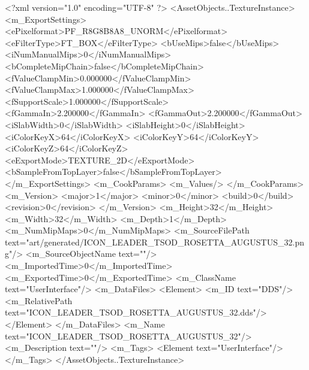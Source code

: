 <?xml version="1.0" encoding="UTF-8" ?>
<AssetObjects..TextureInstance>
	<m_ExportSettings>
		<ePixelformat>PF_R8G8B8A8_UNORM</ePixelformat>
		<eFilterType>FT_BOX</eFilterType>
		<bUseMips>false</bUseMips>
		<iNumManualMips>0</iNumManualMips>
		<bCompleteMipChain>false</bCompleteMipChain>
		<fValueClampMin>0.000000</fValueClampMin>
		<fValueClampMax>1.000000</fValueClampMax>
		<fSupportScale>1.000000</fSupportScale>
		<fGammaIn>2.200000</fGammaIn>
		<fGammaOut>2.200000</fGammaOut>
		<iSlabWidth>0</iSlabWidth>
		<iSlabHeight>0</iSlabHeight>
		<iColorKeyX>64</iColorKeyX>
		<iColorKeyY>64</iColorKeyY>
		<iColorKeyZ>64</iColorKeyZ>
		<eExportMode>TEXTURE_2D</eExportMode>
		<bSampleFromTopLayer>false</bSampleFromTopLayer>
	</m_ExportSettings>
	<m_CookParams>
		<m_Values/>
	</m_CookParams>
	<m_Version>
		<major>1</major>
		<minor>0</minor>
		<build>0</build>
		<revision>0</revision>
	</m_Version>
	<m_Height>32</m_Height>
	<m_Width>32</m_Width>
	<m_Depth>1</m_Depth>
	<m_NumMipMaps>0</m_NumMipMaps>
	<m_SourceFilePath text="art/generated/ICON_LEADER_TSOD_ROSETTA_AUGUSTUS_32.png"/>
	<m_SourceObjectName text=""/>
	<m_ImportedTime>0</m_ImportedTime>
	<m_ExportedTime>0</m_ExportedTime>
	<m_ClassName text="UserInterface"/>
	<m_DataFiles>
		<Element>
			<m_ID text="DDS"/>
			<m_RelativePath text="ICON_LEADER_TSOD_ROSETTA_AUGUSTUS_32.dds"/>
		</Element>
	</m_DataFiles>
	<m_Name text="ICON_LEADER_TSOD_ROSETTA_AUGUSTUS_32"/>
	<m_Description text=""/>
	<m_Tags>
		<Element text="UserInterface"/>
	</m_Tags>
</AssetObjects..TextureInstance>
